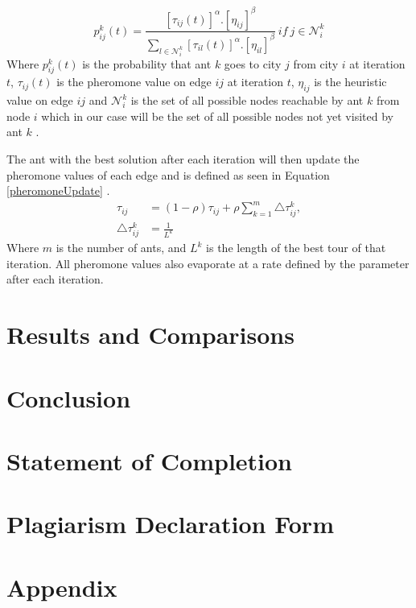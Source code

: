 \documentclass[11pt,a4paper,final]{article}
\begin{document}
	\begin{equation}
	\label{ACOProb}
	p^k_{ij}(t)=\frac{[\tau_{ij}(t)]^{\alpha}.[\eta_{ij}]^{\beta}}{\sum_{l\in\mathcal{N}^k_i}[\tau_{il}(t)]^{\alpha}.[\eta_{il}]^{\beta}}\ if\ j\in\mathcal{N}^k_i
	\end{equation}
	Where $p^k_{ij}(t)$ is the probability that ant $k$ goes to city $j$ from city $i$ at iteration $t$, $\tau_{ij}(t)$ is the pheromone value on edge $ij$ at iteration $t$, $\eta_{ij}$ is the heuristic value on edge $ij$ and $\mathcal{N}^k_i$ is the set of all possible nodes reachable by ant $k$ from node $i$ which in our case will be the set of all possible nodes not yet visited by ant $k$ \cite{GargACO}.\\
	
	\par The ant with the best solution after each iteration will then update the pheromone values of each edge and is defined as seen in Equation \ref{pheromoneUpdate} \cite{fastACO}.
	\begin{equation}
	\label{pheromoneUpdate}
	\begin{split}
	\tau_{ij} &= (1-\rho)\tau_{ij}+\rho\sum_{k=1}^{m}\triangle\tau_{ij}^{k},\\
	\triangle\tau_{ij}^{k} &=\frac{1}{L^k}
	\end{split}	
	\end{equation}
	Where $m$ is the number of ants, and $L^k$ is the length of the best tour of that iteration. All pheromone values also evaporate at a rate defined by the parameter after each iteration.
	\section{Results and Comparisons}
	\label{Results}
	
	\section{Conclusion}
	\label{Conc}
	
	\section{Statement of Completion}
	\label{SoC}
	
	\section{Plagiarism Declaration Form}
	\label{PlagForm}
	
	\section{Appendix}
	\label{Appendix}
	
\end{document}
